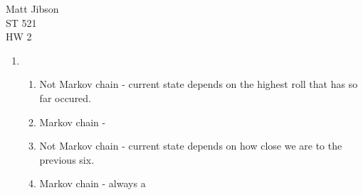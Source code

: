 \documentclass{article}
\begin{document}
\begin{flushright}
Matt Jibson \\
ST 521 \\
HW 2
\end{flushright}

\begin{enumerate}
\item %
	\begin{enumerate}
		\item Not Markov chain - current state depends on the highest roll that has so far occured.
		\item Markov chain -
		\item Not Markov chain - current state depends on how close we are to the previous six.
		\item Markov chain - always a
	\end{enumerate}
\end{enumerate}
\end{document}
